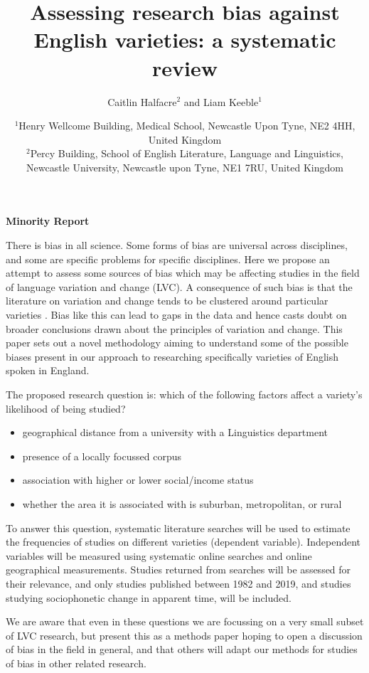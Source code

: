 \documentclass[12pt,a4paper]{article}
\title{Assessing research bias against English varieties: a systematic review}
\author{Caitlin Halfacre$^{2}$ and Liam Keeble$^{1}$}
\date{$^{1}$Henry Wellcome Building, Medical School, Newcastle Upon Tyne, NE2 4HH, United Kingdom\\
$^{2}$Percy Building, School of English Literature, Language and Linguistics, Newcastle University, Newcastle upon Tyne, NE1 7RU, United Kingdom\\}
\newcommand{\todocontentinline}[1]{\todo[color=RoyalPurple,inline]{#1}}
\begin{document}
\begin{center}
	\textbf{Minority Report}\\
\end{center}

\todocontentinline{Current word count 297}
There is bias in all science. Some forms of bias are universal across disciplines, and some are specific problems for specific disciplines. Here we propose an attempt to assess some sources of bias which may be affecting studies in the field of language variation and change (LVC).  
A consequence of such bias is that the literature on variation and change tends to be clustered around particular varieties \cite{Trudgill2002}. Bias like this can lead to gaps in the data and hence casts doubt on broader conclusions drawn about the principles of variation and change. This paper sets out a novel methodology aiming to understand some of the possible biases present in our approach to researching specifically varieties of English spoken in England. 
	
The proposed research question is: which of the following factors affect a variety's likelihood of being studied?
	\begin{itemize}
		\item geographical distance from a university with a Linguistics department
		\item presence of a locally focussed corpus
		\item association with higher or lower social/income status
		\item whether the area it is associated with is suburban, metropolitan, or rural
	\end{itemize}


To answer this question, systematic literature searches will be used to estimate the frequencies of studies on different varieties (dependent variable). Independent variables will be measured using systematic online searches and online geographical measurements. Studies returned from searches will be assessed for their relevance, and only studies published between 1982 \citep{Wells1982b} and 2019, and studies studying sociophonetic change in apparent time, will be included.

We are aware that even in these questions we are focussing on a very small subset of LVC research, but present this as a methods paper hoping to open a discussion of bias in the field in general, and that others will adapt our methods for studies of bias in other related research.


\end{document}
